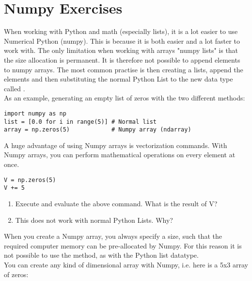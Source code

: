 \documentclass{article}
\begin{document}
\newpage


\section{Numpy Exercises}



When working with Python and math (especially lists), it is a lot easier to use Numerical Python (numpy).
This is because it is both easier and a lot faster to work with.
The only limitation when working with arrays "numpy lists" is that the size allocation is permanent.
It is therefore not possible to append elements to numpy arrays.
The most common practise is then creating a lists, append the elements and then substituting the normal Python List to the new data type called .\\

As an example, generating an empty list of zeros with the two different methods:
\begin{lstlisting}
import numpy as np
list = [0.0 for i in range(5)] # Normal list
array = np.zeros(5)            # Numpy array (ndarray)
\end{lstlisting}

A huge advantage of using Numpy arrays is vectorization commands.
With Numpy arrays, you can perform mathematical operations on every element at once.
\begin{lstlisting}
V = np.zeros(5)
V += 5
\end{lstlisting}

\begin{enumerate}
    \item Execute and evaluate the above command.
        What is the result of V?
    \item This does not work with normal Python Lists. Why? 
\end{enumerate}

When you create a Numpy array, you always specify a size, such that the required computer memory can be pre-allocated by Numpy.
For this reason it is not possible to use the  method, as with the Python list datatype.\\

You can create any kind of dimensional array with Numpy, i.e. here is a 5x3 array of zeros:
\end{document}
